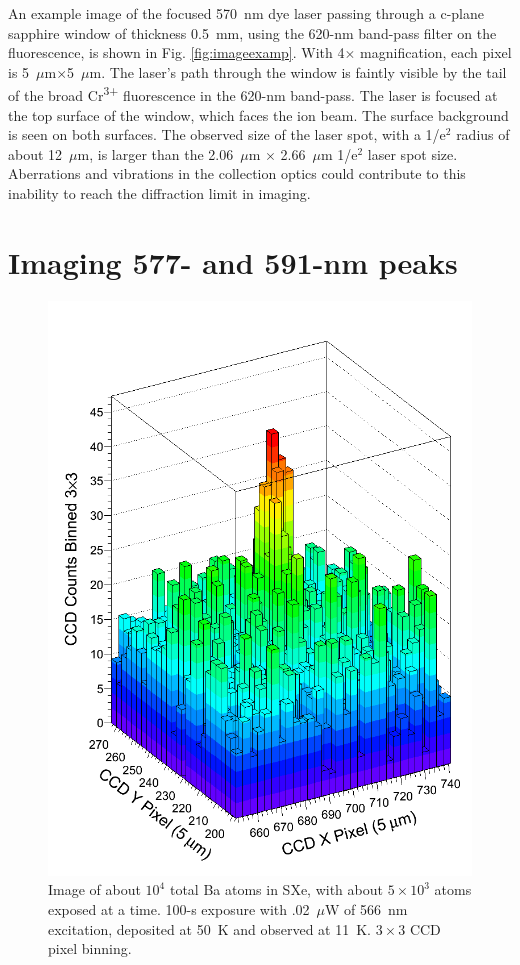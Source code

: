 An example image of the focused 570~nm dye laser passing through a c-plane sapphire window of thickness 0.5~mm, using the 620-nm band-pass filter on the fluorescence, is shown in Fig. \ref{fig:imageexamp}.  With 4$\times$ magnification, each pixel is 5~$\mu$m$\times$5~$\mu$m.  The laser's path through the window is faintly visible by the tail of the broad Cr\textsuperscript{3+} fluorescence in the 620-nm band-pass.  The laser is focused at the top surface of the window, which faces the ion beam.  The surface background is seen on both surfaces.  The observed size of the laser spot, with a 1/e$^{2}$ radius of about 12~$\mu$m, is larger than the 2.06~$\mu$m $\times$ 2.66~$\mu$m 1/e$^{2}$ laser spot size.  Aberrations and vibrations in the collection optics could contribute to this inability to reach the diffraction limit in imaging.


\section{Imaging 577- and 591-nm peaks}
\label{sec:imaging590and577}

\begin{figure} %
        \centering
                \includegraphics[width=.6\textwidth]{figures/image_1e4.png}
                \caption{Image of about $10^{4}$ total Ba atoms in SXe, with about $5 \times 10^{3}$ atoms exposed at a time.  100-s exposure with .02~$\mu$W of 566~nm excitation, deposited at 50~K and observed at 11~K.  $3 \times 3$ CCD pixel binning.}
\label{fig:image590s}
\end{figure}

